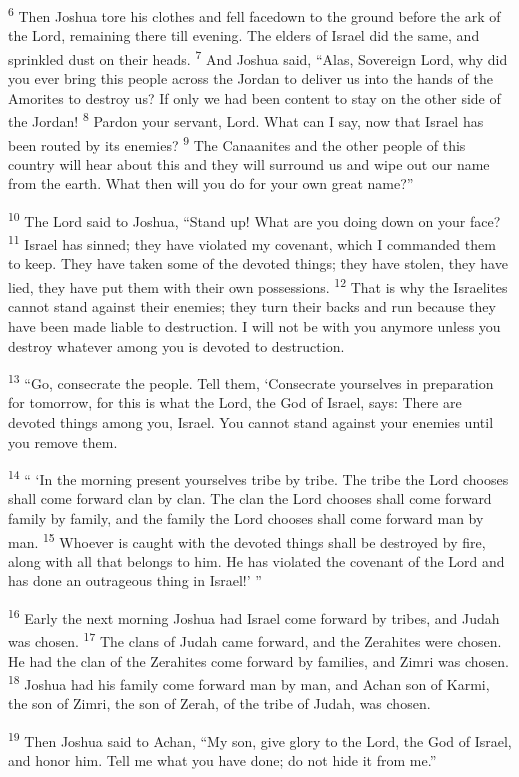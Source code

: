 \documentclass[12pt,twoside]{article}
\newcommand{\vs}[1]{\textsuperscript{#1}}
\begin{document}
\vs{6} Then Joshua tore his clothes and fell facedown to the ground before the ark of the Lord, remaining there till evening. The elders of Israel did the same, and sprinkled dust on their heads.
\vs{7} And Joshua said, ``Alas, Sovereign Lord, why did you ever bring this people across the Jordan to deliver us into the hands of the Amorites to destroy us? If only we had been content to stay on the other side of the Jordan!
\vs{8} Pardon your servant, Lord. What can I say, now that Israel has been routed by its enemies?
\vs{9} The Canaanites and the other people of this country will hear about this and they will surround us and wipe out our name from the earth. What then will you do for your own great name?''

\vs{10} The Lord said to Joshua, ``Stand up! What are you doing down on your face?
\vs{11} Israel has sinned; they have violated my covenant, which I commanded them to keep. They have taken some of the devoted things; they have stolen, they have lied, they have put them with their own possessions.
\vs{12} That is why the Israelites cannot stand against their enemies; they turn their backs and run because they have been made liable to destruction. I will not be with you anymore unless you destroy whatever among you is devoted to destruction.

\vs{13} ``Go, consecrate the people. Tell them, `Consecrate yourselves in preparation for tomorrow, for this is what the Lord, the God of Israel, says: There are devoted things among you, Israel. You cannot stand against your enemies until you remove them.

\vs{14} `` `In the morning present yourselves tribe by tribe. The tribe the Lord chooses shall come forward clan by clan. The clan the Lord chooses shall come forward family by family, and the family the Lord chooses shall come forward man by man.
\vs{15} Whoever is caught with the devoted things shall be destroyed by fire, along with all that belongs to him. He has violated the covenant of the Lord and has done an outrageous thing in Israel!' ''

\vs{16} Early the next morning Joshua had Israel come forward by tribes, and Judah was chosen.
\vs{17} The clans of Judah came forward, and the Zerahites were chosen. He had the clan of the Zerahites come forward by families, and Zimri was chosen.
\vs{18} Joshua had his family come forward man by man, and Achan son of Karmi, the son of Zimri, the son of Zerah, of the tribe of Judah, was chosen.

\vs{19} Then Joshua said to Achan, ``My son, give glory to the Lord, the God of Israel, and honor him. Tell me what you have done; do not hide it from me.''
\end{document}
